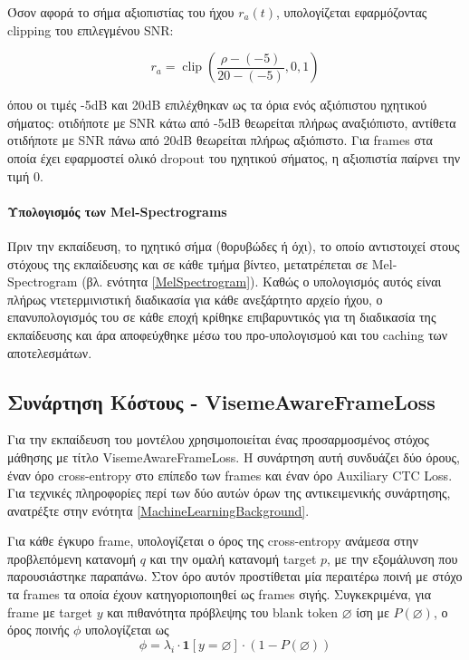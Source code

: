  Όσον αφορά το σήμα αξιοπιστίας του ήχου $r_a(t)$, υπολογίζεται εφαρμόζοντας clipping του επιλεγμένου SNR:
 
 \[
 r_a = \operatorname{clip}\left(\frac{\rho - (-5)}{20 - (-5)}, 0, 1\right)
 \]
 
 όπου οι τιμές -5dB και 20dB επιλέχθηκαν ως τα όρια ενός αξιόπιστου ηχητικού σήματος: οτιδήποτε με SNR κάτω από -5dB θεωρείται πλήρως αναξιόπιστο, αντίθετα οτιδήποτε με SNR πάνω από 20dB θεωρείται πλήρως αξιόπιστο. Για frames στα οποία έχει εφαρμοστεί ολικό dropout του ηχητικού σήματος, η αξιοπιστία παίρνει την τιμή 0.
 
 \paragraph{Υπολογισμός των Mel-Spectrograms}
 
 Πριν την εκπαίδευση, το ηχητικό σήμα (θορυβώδες ή όχι), το οποίο αντιστοιχεί στους στόχους της εκπαίδευσης και σε κάθε τμήμα βίντεο, μετατρέπεται σε Mel-Spectrogram (βλ. ενότητα \ref{MelSpectrogram}). Καθώς ο υπολογισμός αυτός είναι πλήρως ντετερμινιστική διαδικασία για κάθε ανεξάρτητο αρχείο ήχου, ο επανυπολογισμός του σε κάθε εποχή κρίθηκε επιβαρυντικός για τη διαδικασία της εκπαίδευσης και άρα αποφεύχθηκε μέσω του προ-υπολογισμού και του caching των αποτελεσμάτων.

\subsection{Συνάρτηση Κόστους - VisemeAwareFrameLoss}
\label{LossFunction}

Για την εκπαίδευση του μοντέλου χρησιμοποιείται ένας προσαρμοσμένος στόχος μάθησης με τίτλο VisemeAwareFrameLoss. Η συνάρτηση αυτή συνδυάζει δύο όρους, έναν όρο cross-entropy στο επίπεδο των frames και έναν όρο Auxiliary CTC Loss. Για τεχνικές πληροφορίες περί των δύο αυτών όρων της αντικειμενικής συνάρτησης, ανατρέξτε στην ενότητα \ref{MachineLearningBackground}.

Για κάθε έγκυρο frame, υπολογίζεται ο όρος της cross-entropy ανάμεσα στην προβλεπόμενη κατανομή $q$ και την ομαλή κατανομή target $p$, με την εξομάλυνση που παρουσιάστηκε παραπάνω. Στον όρο αυτόν προστίθεται μία περαιτέρω ποινή με στόχο τα frames τα οποία έχουν κατηγοριοποιηθεί ως frames σιγής. Συγκεκριμένα, για frame με target $y$ και πιθανότητα πρόβλεψης του blank token $\varnothing$ ίση με $P(\varnothing)$, ο όρος ποινής $\phi$ υπολογίζεται ως 
\[
\phi = \lambda_i \cdot \mathbf{1}[y = \varnothing] \cdot (1 - P(\varnothing))
\]

